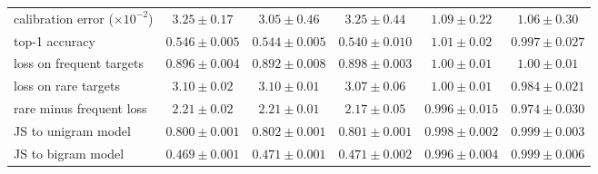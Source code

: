 \begin{center}
\begin{minipage}{\linewidth}
\begin{tabular}{@{}l|ccc|cc@{}}
calibration error ($\times10^{-2}$) & $3.25 \pm 0.17$ & $3.05 \pm 0.46$ & $3.25 \pm 0.44$ & $1.09 \pm 0.22$ & $1.06 \pm 0.30$ \\
top-1 accuracy & $0.546 \pm 0.005$ & $0.544 \pm 0.005$ & $0.540 \pm 0.010$ & $1.01 \pm 0.02$ & $0.997 \pm 0.027$ \\
loss on frequent targets & $0.896 \pm 0.004$ & $0.892 \pm 0.008$ & $0.898 \pm 0.003$ & $1.00 \pm 0.01$ & $1.00 \pm 0.01$ \\
loss on rare targets & $3.10 \pm 0.02$ & $3.10 \pm 0.01$ & $3.07 \pm 0.06$ & $1.00 \pm 0.01$ & $0.984 \pm 0.021$ \\
rare minus frequent loss & $2.21 \pm 0.02$ & $2.21 \pm 0.01$ & $2.17 \pm 0.05$ & $0.996 \pm 0.015$ & $0.974 \pm 0.030$ \\
JS to unigram model & $0.800 \pm 0.001$ & $0.802 \pm 0.001$ & $0.801 \pm 0.001$ & $0.998 \pm 0.002$ & $0.999 \pm 0.003$ \\
JS to bigram model & $0.469 \pm 0.001$ & $0.471 \pm 0.001$ & $0.471 \pm 0.002$ & $0.996 \pm 0.004$ & $0.999 \pm 0.006$ \\
\end{tabular}\end{minipage}
\end{center}

